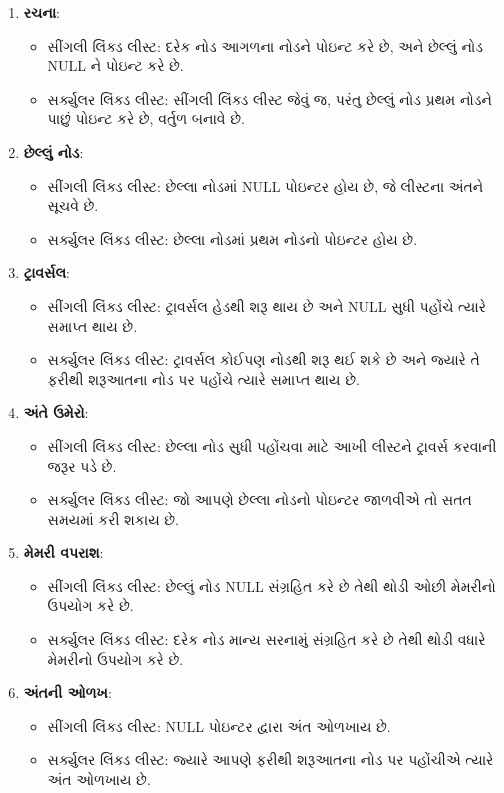 \begin{enumerate}
\def\labelenumi{\arabic{enumi}.}
\tightlist
\item
  \textbf{રચના}:

  \begin{itemize}
  \tightlist
  \item
    સીંગલી લિંક્ડ લીસ્ટ: દરેક નોડ આગળના નોડને પોઇન્ટ કરે છે, અને છેલ્લું નોડ NULL ને
    પોઇન્ટ કરે છે.
  \item
    સર્ક્યુલર લિંક્ડ લીસ્ટ: સીંગલી લિંક્ડ લીસ્ટ જેવું જ, પરંતુ છેલ્લું નોડ પ્રથમ નોડને પાછું
    પોઇન્ટ કરે છે, વર્તુળ બનાવે છે.
  \end{itemize}
\item
  \textbf{છેલ્લું નોડ}:

  \begin{itemize}
  \tightlist
  \item
    સીંગલી લિંક્ડ લીસ્ટ: છેલ્લા નોડમાં NULL પોઇન્ટર હોય છે, જે લીસ્ટના અંતને સૂચવે છે.
  \item
    સર્ક્યુલર લિંક્ડ લીસ્ટ: છેલ્લા નોડમાં પ્રથમ નોડનો પોઇન્ટર હોય છે.
  \end{itemize}
\item
  \textbf{ટ્રાવર્સલ}:

  \begin{itemize}
  \tightlist
  \item
    સીંગલી લિંક્ડ લીસ્ટ: ટ્રાવર્સલ હેડથી શરૂ થાય છે અને NULL સુધી પહોંચે ત્યારે સમાપ્ત
    થાય છે.
  \item
    સર્ક્યુલર લિંક્ડ લીસ્ટ: ટ્રાવર્સલ કોઈપણ નોડથી શરૂ થઈ શકે છે અને જ્યારે તે ફરીથી
    શરૂઆતના નોડ પર પહોંચે ત્યારે સમાપ્ત થાય છે.
  \end{itemize}
\item
  \textbf{અંતે ઉમેરો}:

  \begin{itemize}
  \tightlist
  \item
    સીંગલી લિંક્ડ લીસ્ટ: છેલ્લા નોડ સુધી પહોંચવા માટે આખી લીસ્ટને ટ્રાવર્સ કરવાની જરૂર
    પડે છે.
  \item
    સર્ક્યુલર લિંક્ડ લીસ્ટ: જો આપણે છેલ્લા નોડનો પોઇન્ટર જાળવીએ તો સતત સમયમાં કરી
    શકાય છે.
  \end{itemize}
\item
  \textbf{મેમરી વપરાશ}:

  \begin{itemize}
  \tightlist
  \item
    સીંગલી લિંક્ડ લીસ્ટ: છેલ્લું નોડ NULL સંગ્રહિત કરે છે તેથી થોડી ઓછી મેમરીનો ઉપયોગ
    કરે છે.
  \item
    સર્ક્યુલર લિંક્ડ લીસ્ટ: દરેક નોડ માન્ય સરનામું સંગ્રહિત કરે છે તેથી થોડી વધારે
    મેમરીનો ઉપયોગ કરે છે.
  \end{itemize}
\item
  \textbf{અંતની ઓળખ}:

  \begin{itemize}
  \tightlist
  \item
    સીંગલી લિંક્ડ લીસ્ટ: NULL પોઇન્ટર દ્વારા અંત ઓળખાય છે.
  \item
    સર્ક્યુલર લિંક્ડ લીસ્ટ: જ્યારે આપણે ફરીથી શરૂઆતના નોડ પર પહોંચીએ ત્યારે અંત ઓળખાય
    છે.
  \end{itemize}
\end{enumerate}

